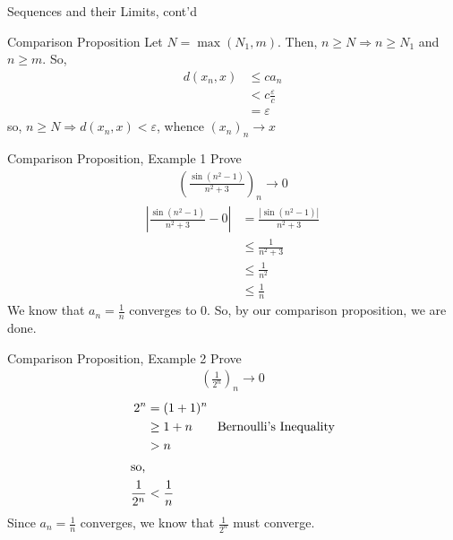 \documentclass[10pt]{extarticle}
\begin{document}
\begin{problem}{Sequences and their Limits, cont'd}
\begin{problem}{Comparison Proposition}
      Let $N = \max(N_1,m)$. Then, $n \geq N\Rightarrow n\geq N_1$ and $n\geq m$. So,
      \begin{align*}
        d(x_n,x) &\leq ca_n\\
        &< c\frac{\varepsilon}{c}\\
        &=\varepsilon
      \end{align*}
      so, $n\geq N \Rightarrow d(x_n,x) < \varepsilon$, whence $(x_n)_n \rightarrow x$
    \end{problem}
    \begin{problem}{Comparison Proposition, Example 1}
      Prove
      \begin{align*}
        \left(\frac{\sin(n^2-1)}{n^2 + 3}\right)_n \rightarrow 0
      \end{align*}
      \tcblower
      \begin{align*}
        \left|\frac{\sin(n^2 - 1)}{n^2 + 3} - 0\right| &= \frac{|\sin(n^2 - 1)|}{n^2 + 3}\\
                                                       &\leq \frac{1}{n^2 + 3}\\
                                                       &\leq \frac{1}{n^2}\\
                                                       &\leq \frac{1}{n}
      \end{align*}
      We know that $a_n = \frac{1}{n}$ converges to $0$. So, by our comparison proposition, we are done.
    \end{problem}
    \begin{problem}{Comparison Proposition, Example 2}
      Prove
      \begin{align*}
        \left(\frac{1}{2^n}\right)_n \rightarrow 0
      \end{align*}
      \tcblower
      \begin{align*}
        2^n &= (1+1)^n\\
            &\geq 1+n\tag*{Bernoulli's Inequality}\\
            &>n\\
            \shortintertext{so,}
        \frac{1}{2^n} &< \frac{1}{n}
      \end{align*}
      Since $a_n = \frac{1}{n}$ converges, we know that $\frac{1}{2^n}$ must converge.
    \end{problem}
  \end{problem}
\end{document}
